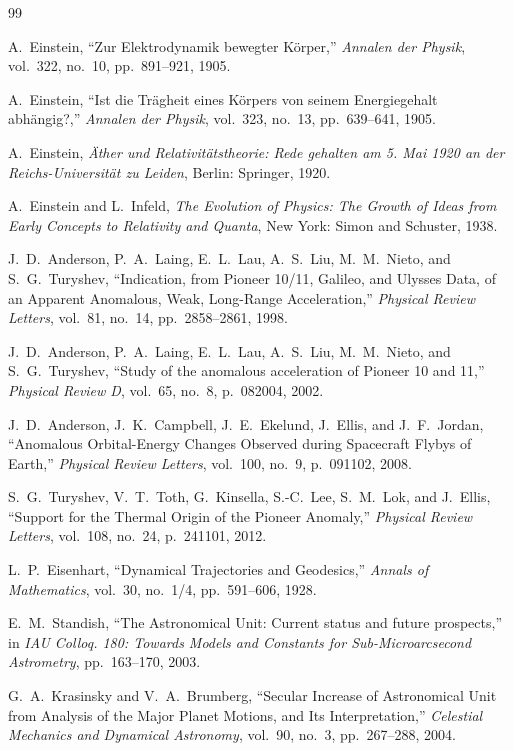 \documentclass[11pt,a4paper]{article}
\begin{document}
\begin{thebibliography}{99}

A.~Einstein, ``Zur Elektrodynamik bewegter K{\"o}rper,'' \textit{Annalen der Physik}, vol.~322, no.~10, pp.~891--921, 1905.

A.~Einstein, ``Ist die Tr{\"a}gheit eines K{\"o}rpers von seinem Energiegehalt abh{\"a}ngig?,'' \textit{Annalen der Physik}, vol.~323, no.~13, pp.~639--641, 1905.

A.~Einstein, \textit{{\"A}ther und Relativit{\"a}tstheorie: Rede gehalten am 5. Mai 1920 an der Reichs-Universit{\"a}t zu Leiden}, Berlin: Springer, 1920.

A.~Einstein and L.~Infeld, \textit{The Evolution of Physics: The Growth of Ideas from Early Concepts to Relativity and Quanta}, New York: Simon and Schuster, 1938.

J.~D.~Anderson, P.~A.~Laing, E.~L.~Lau, A.~S.~Liu, M.~M.~Nieto, and S.~G.~Turyshev, ``Indication, from Pioneer 10/11, Galileo, and Ulysses Data, of an Apparent Anomalous, Weak, Long-Range Acceleration,'' \textit{Physical Review Letters}, vol.~81, no.~14, pp.~2858--2861, 1998.

J.~D.~Anderson, P.~A.~Laing, E.~L.~Lau, A.~S.~Liu, M.~M.~Nieto, and S.~G.~Turyshev, ``Study of the anomalous acceleration of Pioneer 10 and 11,'' \textit{Physical Review D}, vol.~65, no.~8, p.~082004, 2002.

J.~D.~Anderson, J.~K.~Campbell, J.~E.~Ekelund, J.~Ellis, and J.~F.~Jordan, ``Anomalous Orbital-Energy Changes Observed during Spacecraft Flybys of Earth,'' \textit{Physical Review Letters}, vol.~100, no.~9, p.~091102, 2008.

S.~G.~Turyshev, V.~T.~Toth, G.~Kinsella, S.-C.~Lee, S.~M.~Lok, and J.~Ellis, ``Support for the Thermal Origin of the Pioneer Anomaly,'' \textit{Physical Review Letters}, vol.~108, no.~24, p.~241101, 2012.

L.~P.~Eisenhart, ``Dynamical Trajectories and Geodesics,'' \textit{Annals of Mathematics}, vol.~30, no.~1/4, pp.~591--606, 1928.

E.~M.~Standish, ``The Astronomical Unit: Current status and future prospects,'' in \textit{IAU Colloq. 180: Towards Models and Constants for Sub-Microarcsecond Astrometry}, pp.~163--170, 2003.

G.~A.~Krasinsky and V.~A.~Brumberg, ``Secular Increase of Astronomical Unit from Analysis of the Major Planet Motions, and Its Interpretation,'' \textit{Celestial Mechanics and Dynamical Astronomy}, vol.~90, no.~3, pp.~267--288, 2004.


\end{thebibliography}
\end{document}

